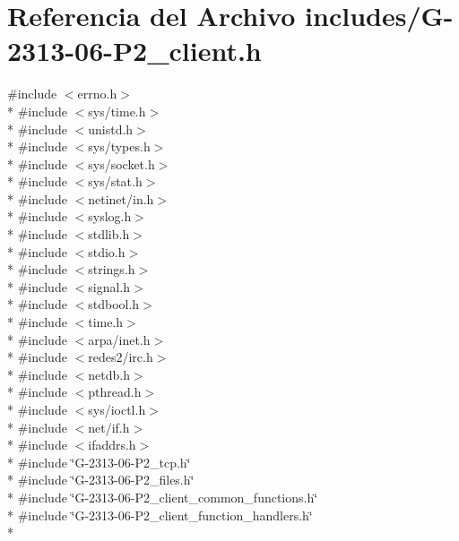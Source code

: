 \hypertarget{G-2313-06-P2__client_8h}{}\section{Referencia del Archivo includes/\+G-\/2313-\/06-\/\+P2\+\_\+client.h}
\label{G-2313-06-P2__client_8h}
{\ttfamily \#include $<$errno.\+h$>$}\\*
{\ttfamily \#include $<$sys/time.\+h$>$}\\*
{\ttfamily \#include $<$unistd.\+h$>$}\\*
{\ttfamily \#include $<$sys/types.\+h$>$}\\*
{\ttfamily \#include $<$sys/socket.\+h$>$}\\*
{\ttfamily \#include $<$sys/stat.\+h$>$}\\*
{\ttfamily \#include $<$netinet/in.\+h$>$}\\*
{\ttfamily \#include $<$syslog.\+h$>$}\\*
{\ttfamily \#include $<$stdlib.\+h$>$}\\*
{\ttfamily \#include $<$stdio.\+h$>$}\\*
{\ttfamily \#include $<$strings.\+h$>$}\\*
{\ttfamily \#include $<$signal.\+h$>$}\\*
{\ttfamily \#include $<$stdbool.\+h$>$}\\*
{\ttfamily \#include $<$time.\+h$>$}\\*
{\ttfamily \#include $<$arpa/inet.\+h$>$}\\*
{\ttfamily \#include $<$redes2/irc.\+h$>$}\\*
{\ttfamily \#include $<$netdb.\+h$>$}\\*
{\ttfamily \#include $<$pthread.\+h$>$}\\*
{\ttfamily \#include $<$sys/ioctl.\+h$>$}\\*
{\ttfamily \#include $<$net/if.\+h$>$}\\*
{\ttfamily \#include $<$ifaddrs.\+h$>$}\\*
{\ttfamily \#include \char`\"{}G-\/2313-\/06-\/\+P2\+\_\+tcp.\+h\char`\"{}}\\*
{\ttfamily \#include \char`\"{}G-\/2313-\/06-\/\+P2\+\_\+files.\+h\char`\"{}}\\*
{\ttfamily \#include \char`\"{}G-\/2313-\/06-\/\+P2\+\_\+client\+\_\+common\+\_\+functions.\+h\char`\"{}}\\*
{\ttfamily \#include \char`\"{}G-\/2313-\/06-\/\+P2\+\_\+client\+\_\+function\+\_\+handlers.\+h\char`\"{}}\\*
